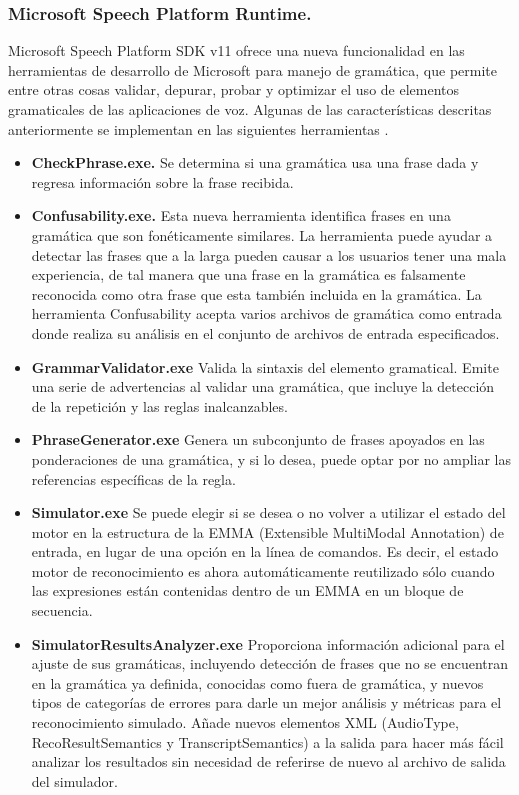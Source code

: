 \documentclass[11pt,a4paper]{article}
\begin{document}
\subsubsection{Microsoft Speech Platform Runtime.}
Microsoft Speech Platform SDK v11 ofrece una nueva funcionalidad en las herramientas de desarrollo de Microsoft para manejo de gramática, que permite entre otras cosas validar, depurar, probar y optimizar el uso de elementos gramaticales de las aplicaciones de voz. Algunas de las características descritas anteriormente se implementan en las siguientes herramientas \nocite{Microsoft_sdn}.
\begin{itemize}
\item \textbf{CheckPhrase.exe.} Se determina si una gramática usa una frase dada y regresa información sobre la frase recibida. %
\item \textbf{Confusability.exe.} Esta nueva herramienta identifica frases en una gramática que son fonéticamente similares. La herramienta puede ayudar a detectar las frases que a la larga pueden causar a los usuarios tener una mala experiencia, de tal manera que una frase en la gramática es falsamente reconocida como otra frase que esta también incluida en la gramática. La herramienta Confusability acepta varios archivos de gramática como entrada donde realiza su análisis en el conjunto de archivos de entrada especificados.
\item \textbf{GrammarValidator.exe} Valida la sintaxis del elemento gramatical. Emite una serie de advertencias al validar una gramática, que incluye la detección de la repetición y las reglas inalcanzables.
\item \textbf{PhraseGenerator.exe} Genera un subconjunto de frases apoyados en las ponderaciones de una gramática, y si lo desea, puede optar por no ampliar las referencias específicas de la regla.
\item \textbf{Simulator.exe} Se puede elegir si se desea o no volver a utilizar el estado del motor en la estructura de la EMMA (Extensible MultiModal Annotation) de entrada, en lugar de una opción en la línea de comandos. Es decir, el estado motor de reconocimiento es ahora automáticamente reutilizado sólo cuando las expresiones están contenidas dentro de un EMMA en un bloque de secuencia.  %
\item \textbf{SimulatorResultsAnalyzer.exe} Proporciona información adicional para el ajuste de sus gramáticas, incluyendo detección de frases que no se encuentran en la gramática ya definida, conocidas como fuera de gramática, y nuevos tipos de categorías de errores para darle un mejor análisis y métricas para el reconocimiento simulado. Añade nuevos elementos XML (AudioType, RecoResultSemantics y TranscriptSemantics) a la salida para hacer más fácil analizar los resultados sin necesidad de referirse de nuevo al archivo de salida del simulador.
\end{itemize} 
\end{document}
